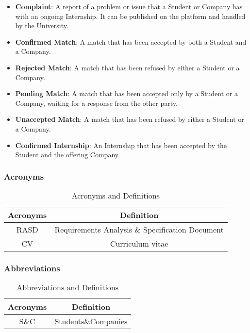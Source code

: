 \begin{itemize}
    \item \textcolor{titleColor}{\textbf{Complaint}\label{def:complaint}}: A report of a problem or issue that a Student or Company has with an ongoing Internship. It can be published on the platform and handled by the University.
    \item \textcolor{titleColor}{\textbf{Confirmed Match}\label{def:confirmedMatch}}: A match that has been accepted by both a Student and a Company.
    \item \textcolor{titleColor}{\textbf{Rejected Match}\label{def:rejectedMatch}}: A match that has been refused by either a Student or a Company.
    \item \textcolor{titleColor}{\textbf{Pending Match}\label{def:pendingMatch}}: A match that has been accepted only by a Student or a Company, waiting for a response from the other party.
    \item \textcolor{titleColor}{\textbf{Unaccepted Match}\label{def:unacceptedMatch}}: A match that has been refused by either a Student or a Company.
    \item \textcolor{titleColor}{\textbf{Confirmed Internship}\label{def:confirmdInternship}}: An Internship that has been accepted by the Student and the offering Company.
    
    
    
\end{itemize}

\subsubsection{Acronyms}
\begin{table}[h]
    \centering
\begin{tabular}{|c|c|}
        \hline
        \textbf{Acronyms} & \textbf{Definition} \\ \hline
        RASD & Requirements Analysis \& Specification Document\\ \hline
        CV & Curriculum vitae\\ \hline
    \end{tabular}
    \caption{Acronyms and Definitions}
    \label{tab:acronyms}
\end{table}

\subsubsection{Abbreviations}
\begin{table}[h]
    \centering
\begin{tabular}{|c|c|}
        \hline
        \textbf{Acronyms} & \textbf{Definition} \\ \hline
        S\&C & Students\&Companies \\ \hline
    \end{tabular}
    \caption{Abbreviations and Definitions}
    \label{tab:abbreviations}
\end{table}

